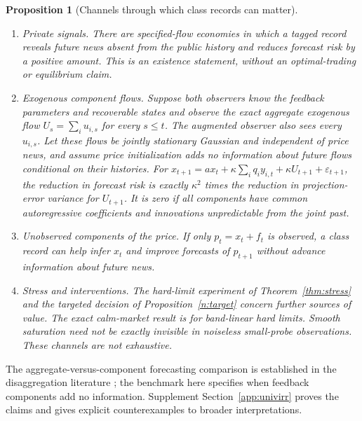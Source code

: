 \documentclass[12pt]{article}
\newtheorem{proposition}[theorem]{Proposition}
\theoremstyle{definition}
\theoremstyle{remark}
\begin{document}
\begin{proposition}[Channels through which class records can matter]\label{n:exc}
\begin{enumerate}[label=(\alph*),itemsep=1pt]
\item \emph{Private signals.} There are specified-flow economies in which a tagged record reveals future news absent from the public history and reduces forecast risk by a positive amount. This is an existence statement, without an optimal-trading or equilibrium claim.
\item \emph{Exogenous component flows.} Suppose both observers know the feedback parameters and recoverable states and observe the exact aggregate exogenous flow $U_s=\sum_i u_{i,s}$ for every $s\le t$. The augmented observer also sees every $u_{i,s}$. Let these flows be jointly stationary Gaussian and independent of price news, and assume price initialization adds no information about future flows conditional on their histories. For
$x_{t+1}=a x_t+\kappa\sum_iq_i y_{i,t}+\kappa U_{t+1}+\varepsilon_{t+1}$,
the reduction in forecast risk is exactly $\kappa^2$ times the reduction in projection-error variance for $U_{t+1}$. It is zero if all components have common autoregressive coefficients and innovations unpredictable from the joint past.
\item \emph{Unobserved components of the price.} If only $p_t=x_t+f_t$ is observed, a class record can help infer $x_t$ and improve forecasts of $p_{t+1}$ without advance information about future news.
\item \emph{Stress and interventions.} The hard-limit experiment of Theorem~\ref{thm:stress} and the targeted decision of Proposition~\ref{n:target} concern further sources of value. The exact calm-market result is for band-linear hard limits. Smooth saturation need not be exactly invisible in noiseless small-probe observations. These channels are not exhaustive.
\end{enumerate}
\end{proposition}

The aggregate-versus-component forecasting comparison is established in the disaggregation literature \citep{lutkepohl1987,hendry2011}; the benchmark here specifies when feedback components add no information. Supplement Section~\ref{app:univirr} proves the claims and gives explicit counterexamples to broader interpretations.
\end{document}
